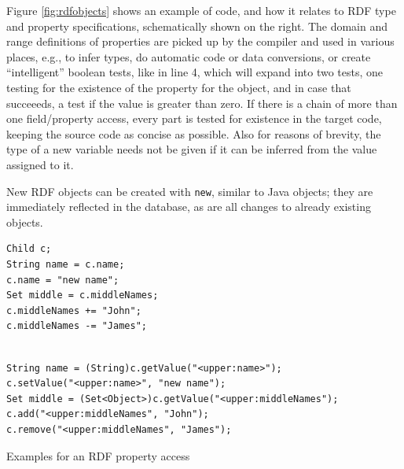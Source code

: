 Figure \ref{fig:rdfobjects} shows an example of \vonda code, and how it relates
to RDF type and property specifications, schematically shown on the right.  The
domain and range definitions of properties are picked up by the compiler and
used in various places, e.g., to infer types, do automatic code or data
conversions, or create ``intelligent'' boolean tests, like in line 4, which
will expand into two tests, one testing for the existence of the property for
the object, and in case that succeeeds, a test if the value is greater than
zero. If there is a chain of more than one field/property access, every part is
tested for existence in the target code, keeping the source code as concise as
possible. Also for reasons of brevity, the type of a new variable needs not be
given if it can be inferred from the value assigned to it.

New RDF objects can be created with \texttt{new}, similar to Java objects; they
are immediately reflected in the database, as are all changes to already
existing objects.



\begin{table}[htbp]
  \centering
\begin{small}
\begin{minipage}[t]{0.35\textwidth}
\begin{verbatim}
Child c;
String name = c.name;
c.name = "new name";
Set middle = c.middleNames;
c.middleNames += "John";
c.middleNames -= "James";
\end{verbatim}
\end{minipage}
\begin{minipage}[t]{0.6\textwidth}
\begin{verbatim}

String name = (String)c.getValue("<upper:name>");
c.setValue("<upper:name>", "new name");
Set middle = (Set<Object>)c.getValue("<upper:middleNames");
c.add("<upper:middleNames", "John");
c.remove("<upper:middleNames", "James");
\end{verbatim}
\end{minipage}
\end{small}
  \caption{Examples for an RDF property access}
  \label{tab:property-access}
\end{table}

